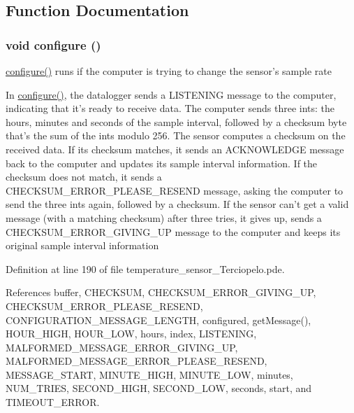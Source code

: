 \subsection{Function Documentation}
\hypertarget{applet_2temperature__sensor___terciopelo_8pde_e369b3765489ee8bd0ea791c1843630f}{
\subsubsection[{configure}]{\setlength{\rightskip}{0pt plus 5cm}void configure ()}}
\label{applet_2temperature__sensor___terciopelo_8pde_e369b3765489ee8bd0ea791c1843630f}


\hyperlink{applet_2nublogger_8h_e369b3765489ee8bd0ea791c1843630f}{configure()} runs if the computer is trying to change the sensor's sample rate 

In \hyperlink{applet_2nublogger_8h_e369b3765489ee8bd0ea791c1843630f}{configure()}, the datalogger sends a LISTENING message to the computer, indicating that it's ready to receive data. The computer sends three ints: the hours, minutes and seconds of the sample interval, followed by a checksum byte that's the sum of the ints modulo 256. The sensor computes a checksum on the received data. If its checksum matches, it sends an ACKNOWLEDGE message back to the computer and updates its sample interval information. If the checksum does not match, it sends a CHECKSUM\_\-ERROR\_\-PLEASE\_\-RESEND message, asking the computer to send the three ints again, followed by a checksum. If the sensor can't get a valid message (with a matching checksum) after three tries, it gives up, sends a CHECKSUM\_\-ERROR\_\-GIVING\_\-UP message to the computer and keeps its original sample interval information 

Definition at line 190 of file temperature\_\-sensor\_\-Terciopelo.pde.

References buffer, CHECKSUM, CHECKSUM\_\-ERROR\_\-GIVING\_\-UP, CHECKSUM\_\-ERROR\_\-PLEASE\_\-RESEND, CONFIGURATION\_\-MESSAGE\_\-LENGTH, configured, getMessage(), HOUR\_\-HIGH, HOUR\_\-LOW, hours, index, LISTENING, MALFORMED\_\-MESSAGE\_\-ERROR\_\-GIVING\_\-UP, MALFORMED\_\-MESSAGE\_\-ERROR\_\-PLEASE\_\-RESEND, MESSAGE\_\-START, MINUTE\_\-HIGH, MINUTE\_\-LOW, minutes, NUM\_\-TRIES, SECOND\_\-HIGH, SECOND\_\-LOW, seconds, start, and TIMEOUT\_\-ERROR.

